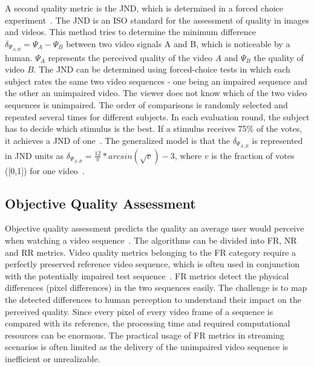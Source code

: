 A second quality metric is the \ac{JND}, which is determined in a forced choice experiment~\cite{Keelan2003,Watson2001}.
The \ac{JND} is an \ac{ISO} standard for the assessment of quality in images and videos.
This method tries to determine the minimum difference $\delta_{\Psi_{A,B}} = \Psi_A - \Psi_B$ between two video signals A and B, which is noticeable by a human.
$\Psi_A$ represents the perceived quality of the video $A$ and $\Psi_B$ the quality of video $B$.
The \ac{JND} can be determined using forced-choice tests in which each subject rates the same two video sequences - one being an impaired sequence and the other an unimpaired video.
The viewer does not know which of the two video sequences is unimpaired.
The order of comparisons is randomly selected and repeated several times for different subjects.
In each evaluation round, the subject has to decide which stimulus is the best. 
If a stimulus receives 75\% of the votes, it achieves a \ac{JND} of one~\cite{Thang2014}.
The generalized model is that the 
$\delta_{\Psi_{A,B}}$ is represented in \ac{JND} units as $\delta_{\Psi_{A,B}}  = \frac{12}{\pi} * arcsin(\sqrt{v})-3$, where $v$ is the fraction of votes ([0,1]) for one video~\cite{Thang2014}.
\subsection{Objective Quality Assessment}
\label{sec:210_ojective_quality}
Objective quality assessment predicts the quality an average user would perceive when watching a video sequence~\cite{Winkler2008}. 
The algorithms can be divided into \ac{FR}, \ac{NR} and \ac{RR} metrics.
Video quality metrics belonging to the \ac{FR} category require a perfectly preserved reference video sequence, which is often used in conjunction with the potentially impaired test sequence~\cite{Winkler2008}.
\ac{FR} metrics detect the physical differences (pixel differences) in the two sequences easily.
The challenge is to map the detected differences to human perception to understand their impact on the perceived quality.
Since every pixel of every video frame of a sequence is compared with its reference, the processing time and required computational resources can be enormous. 
The practical usage of \ac{FR} metrics in streaming scenarios is often limited as the delivery of the unimpaired video sequence is inefficient or unrealizable.

